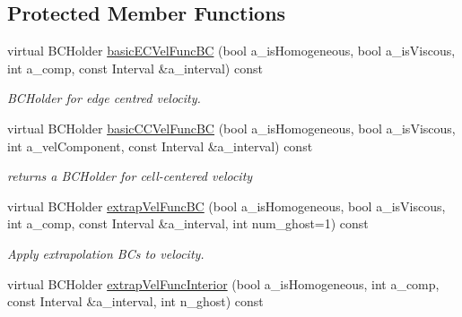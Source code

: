 \subsection*{Protected Member Functions}
\begin{DoxyCompactItemize}
\item 
\hypertarget{class_phys_b_c_util_ad36596132d256e449f3cee586f8db8c5}{virtual B\-C\-Holder \hyperlink{class_phys_b_c_util_ad36596132d256e449f3cee586f8db8c5}{basic\-E\-C\-Vel\-Func\-B\-C} (bool a\-\_\-is\-Homogeneous, bool a\-\_\-is\-Viscous, int a\-\_\-comp, const Interval \&a\-\_\-interval) const }\label{class_phys_b_c_util_ad36596132d256e449f3cee586f8db8c5}

\begin{DoxyCompactList}\small\item\em B\-C\-Holder for edge centred velocity. \end{DoxyCompactList}\item 
\hypertarget{class_phys_b_c_util_a5575a252b14709be10c556f65f8d98d6}{virtual B\-C\-Holder \hyperlink{class_phys_b_c_util_a5575a252b14709be10c556f65f8d98d6}{basic\-C\-C\-Vel\-Func\-B\-C} (bool a\-\_\-is\-Homogeneous, bool a\-\_\-is\-Viscous, int a\-\_\-vel\-Component, const Interval \&a\-\_\-interval) const }\label{class_phys_b_c_util_a5575a252b14709be10c556f65f8d98d6}

\begin{DoxyCompactList}\small\item\em returns a B\-C\-Holder for cell-\/centered velocity \end{DoxyCompactList}\item 
\hypertarget{class_phys_b_c_util_aa296d3c2bac46734f50b55de22b45548}{virtual B\-C\-Holder \hyperlink{class_phys_b_c_util_aa296d3c2bac46734f50b55de22b45548}{extrap\-Vel\-Func\-B\-C} (bool a\-\_\-is\-Homogeneous, bool a\-\_\-is\-Viscous, int a\-\_\-comp, const Interval \&a\-\_\-interval, int num\-\_\-ghost=1) const }\label{class_phys_b_c_util_aa296d3c2bac46734f50b55de22b45548}

\begin{DoxyCompactList}\small\item\em Apply extrapolation B\-Cs to velocity. \end{DoxyCompactList}\item 
\hypertarget{class_phys_b_c_util_a25fcb4a8892a70b42eca416dfa01be63}{virtual B\-C\-Holder \hyperlink{class_phys_b_c_util_a25fcb4a8892a70b42eca416dfa01be63}{extrap\-Vel\-Func\-Interior} (bool a\-\_\-is\-Homogeneous, int a\-\_\-comp, const Interval \&a\-\_\-interval, int n\-\_\-ghost) const }\label{class_phys_b_c_util_a25fcb4a8892a70b42eca416dfa01be63}


\end{DoxyCompactItemize}
